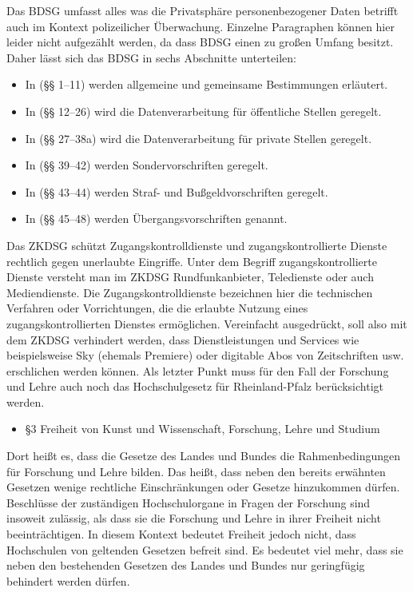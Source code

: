 \documentclass[10pt,a4paper]{article}
\begin{document}
Das BDSG umfasst alles was die Privatsphäre personenbezogener Daten betrifft auch im Kontext polizeilicher Überwachung. Einzelne Paragraphen können hier leider nicht aufgezählt werden, da dass BDSG einen zu großen Umfang besitzt. Daher lässt sich das BDSG in sechs Abschnitte unterteilen:
\begin{itemize}
	\item In (§§ 1–11) werden allgemeine und gemeinsame Bestimmungen erläutert.
	\item In (§§ 12–26) wird die Datenverarbeitung für öffentliche Stellen geregelt.
	\item In (§§ 27–38a) wird die Datenverarbeitung für private Stellen geregelt.
	\item In (§§ 39–42) werden Sondervorschriften geregelt.
	\item In (§§ 43–44) werden Straf- und Bußgeldvorschriften geregelt.
	\item In (§§ 45–48) werden Übergangsvorschriften genannt.
\end{itemize}
Das ZKDSG schützt Zugangskontrolldienste und zugangskontrollierte Dienste rechtlich gegen unerlaubte Eingriffe. Unter dem Begriff zugangskontrollierte Dienste versteht man im ZKDSG Rundfunkanbieter, Teledienste oder auch Mediendienste. Die Zugangskontrolldienste bezeichnen hier die technischen Verfahren oder Vorrichtungen, die die erlaubte Nutzung eines zugangskontrollierten Dienstes ermöglichen. Vereinfacht ausgedrückt, soll also mit dem ZKDSG verhindert werden, dass Dienstleistungen und Services wie beispielsweise Sky (ehemals Premiere) oder digitable Abos von Zeitschriften usw. erschlichen werden können. 
Als letzter Punkt muss für den Fall der Forschung und Lehre auch noch das Hochschulgesetz für Rheinland-Pfalz berücksichtigt werden. 
\begin{itemize}
	\item §3 Freiheit von Kunst und Wissenschaft, Forschung, Lehre und Studium
\end{itemize}
Dort heißt es, dass die Gesetze des Landes und Bundes die Rahmenbedingungen für Forschung und Lehre bilden. Das heißt, dass neben den bereits erwähnten Gesetzen wenige rechtliche Einschränkungen oder Gesetze hinzukommen dürfen. Beschlüsse der zuständigen Hochschulorgane in Fragen der Forschung sind insoweit zulässig, als dass sie die Forschung und Lehre in ihrer Freiheit nicht beeinträchtigen. In diesem Kontext bedeutet Freiheit jedoch nicht, dass Hochschulen von geltenden Gesetzen befreit sind. Es bedeutet viel mehr, dass sie neben den bestehenden Gesetzen des Landes und Bundes nur geringfügig behindert werden dürfen.
\end{document}
